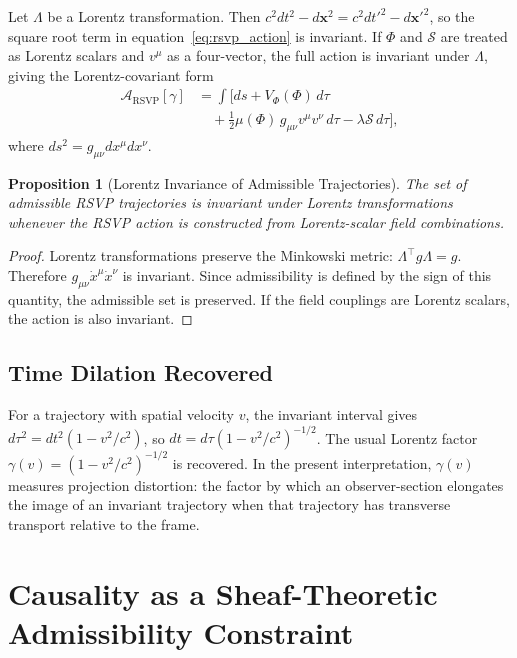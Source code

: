 \documentclass[11pt, a4paper, twocolumn]{article}
\newtheorem{proposition}[definition]{Proposition}
\newcommand{\Sfield}{\mathcal{S}}
\begin{document}
Let $\Lambda$ be a Lorentz transformation. Then
$c^2dt^2-d\mathbf{x}^2 = c^2dt'^2-d\mathbf{x}'^2$, so the square root term in
equation~\eqref{eq:rsvp_action} is invariant. If $\Phi$ and $\Sfield$ are
treated as Lorentz scalars and $v^\mu$ as a four-vector, the full action is
invariant under $\Lambda$, giving the Lorentz-covariant form
\begin{align*}
    \mathcal{A}_{\mathrm{RSVP}}[\gamma]
    &=
    \int\!\bigl[
        ds
        + V_\Phi(\Phi)\,d\tau
        \\&\quad
        + \tfrac{1}{2}\mu(\Phi)\,g_{\mu\nu}v^\mu v^\nu\,d\tau
        - \lambda\Sfield\,d\tau
    \bigr],
\end{align*}
where $ds^2 = g_{\mu\nu}dx^\mu dx^\nu$.

\begin{proposition}[Lorentz Invariance of Admissible Trajectories]
The set of admissible RSVP trajectories is invariant under Lorentz
transformations whenever the RSVP action is constructed from Lorentz-scalar
field combinations.
\end{proposition}

\begin{proof}
Lorentz transformations preserve the Minkowski metric: $\Lambda^\top g \Lambda
= g$. Therefore $g_{\mu\nu}\dot{x}^\mu\dot{x}^\nu$ is invariant. Since
admissibility is defined by the sign of this quantity, the admissible set is
preserved. If the field couplings are Lorentz scalars, the action is also
invariant.
\end{proof}

\subsection{Time Dilation Recovered}

For a trajectory with spatial velocity $v$, the invariant interval gives
$d\tau^2 = dt^2(1-v^2/c^2)$, so $dt = d\tau(1-v^2/c^2)^{-1/2}$. The usual
Lorentz factor $\gamma(v) = (1-v^2/c^2)^{-1/2}$ is recovered. In the present
interpretation, $\gamma(v)$ measures projection distortion: the factor by which
an observer-section elongates the image of an invariant trajectory when that
trajectory has transverse transport relative to the frame.

\section{Causality as a Sheaf-Theoretic Admissibility Constraint}
\end{document}
